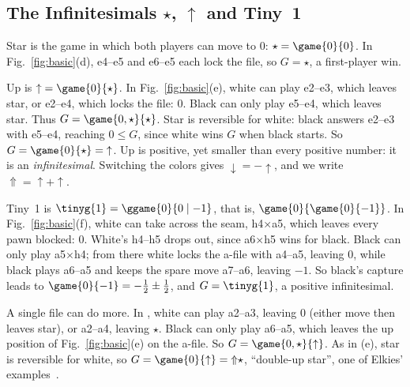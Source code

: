 \subsection{The Infinitesimals \texorpdfstring{$\star$, ${\uparrow}$}{Star, Up} and Tiny~1}\label{sec:basic-inf}
Star is the game in which both players can move to $0$: $\star=\game{0}{0}$. In Fig.~\ref{fig:basic}(d),
e4--e5 and e6--e5 each lock the file, so $G=\star$, a first-player win.

Up is ${\uparrow}=\game{0}{\star}$. In Fig.~\ref{fig:basic}(e), white can play e2--e3, which leaves star, or
e2--e4, which locks the file: $0$. Black can only play e5--e4, which leaves star. Thus
$G=\game{0,\star}{\star}$. Star is reversible for white: black answers e2--e3 with e5--e4, reaching
$0\le G$, since white wins $G$ when black starts. So $G=\game{0}{\star}={\uparrow}$. Up is positive, yet
smaller than every positive number: it is an \emph{infinitesimal}. Switching the colors gives
${\downarrow}=-{\uparrow}$, and we write ${\Uparrow}={\uparrow}+{\uparrow}$.

Tiny~1 is $\tinyg{1}=\ggame{0}{0\mid -1}$, that is, $\game{0}{\game{0}{-1}}$. In Fig.~\ref{fig:basic}(f), white
can take across the seam, h4$\times$a5, which leaves every pawn blocked: $0$. White's h4--h5 drops out, since
a6$\times$h5 wins for black. Black can only play a5$\times$h4; from there white locks the a-file with a4--a5,
leaving $0$, while black plays a6--a5 and keeps the spare move a7--a6, leaving $-1$. So black's capture leads
to $\game{0}{-1}=-\tfrac12\pm\tfrac12$, and $G=\tinyg{1}$, a positive infinitesimal.

A single file can do more. In , white can play a2--a3, leaving $0$ (either move then leaves
star), or a2--a4, leaving $\star$. Black can only play a6--a5, which leaves the up position of
Fig.~\ref{fig:basic}(e) on the a-file. So $G=\game{0,\star}{{\uparrow}}$. As in (e), star is reversible for
white, so $G=\game{0}{{\uparrow}}={\Uparrow}\star$, ``double-up star'', one of Elkies'
examples~\cite{Elkies1996}.
